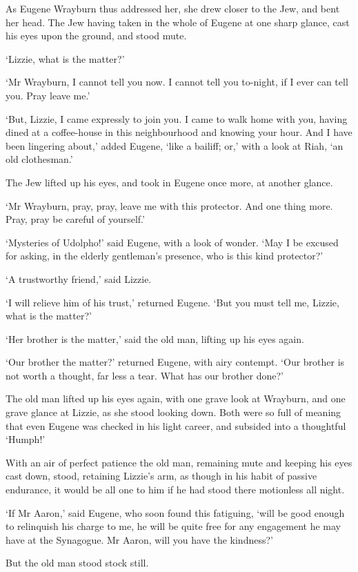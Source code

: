 As Eugene Wrayburn thus addressed her, she drew closer to the Jew, and
bent her head. The Jew having taken in the whole of Eugene at one sharp
glance, cast his eyes upon the ground, and stood mute.

‘Lizzie, what is the matter?’

‘Mr Wrayburn, I cannot tell you now. I cannot tell you to-night, if I
ever can tell you. Pray leave me.’

‘But, Lizzie, I came expressly to join you. I came to walk home with
you, having dined at a coffee-house in this neighbourhood and knowing
your hour. And I have been lingering about,’ added Eugene, ‘like a
bailiff; or,’ with a look at Riah, ‘an old clothesman.’

The Jew lifted up his eyes, and took in Eugene once more, at another
glance.

‘Mr Wrayburn, pray, pray, leave me with this protector. And one thing
more. Pray, pray be careful of yourself.’

‘Mysteries of Udolpho!’ said Eugene, with a look of wonder. ‘May I be
excused for asking, in the elderly gentleman’s presence, who is this
kind protector?’

‘A trustworthy friend,’ said Lizzie.

‘I will relieve him of his trust,’ returned Eugene. ‘But you must tell
me, Lizzie, what is the matter?’

‘Her brother is the matter,’ said the old man, lifting up his eyes
again.

‘Our brother the matter?’ returned Eugene, with airy contempt. ‘Our
brother is not worth a thought, far less a tear. What has our brother
done?’

The old man lifted up his eyes again, with one grave look at Wrayburn,
and one grave glance at Lizzie, as she stood looking down. Both were so
full of meaning that even Eugene was checked in his light career, and
subsided into a thoughtful ‘Humph!’

With an air of perfect patience the old man, remaining mute and keeping
his eyes cast down, stood, retaining Lizzie’s arm, as though in his
habit of passive endurance, it would be all one to him if he had stood
there motionless all night.

‘If Mr Aaron,’ said Eugene, who soon found this fatiguing, ‘will be good
enough to relinquish his charge to me, he will be quite free for any
engagement he may have at the Synagogue. Mr Aaron, will you have the
kindness?’

But the old man stood stock still.

